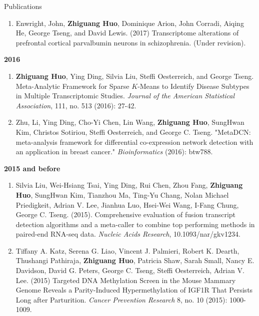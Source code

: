 \documentclass{resume} %
\begin{document}
\begin{rSection}{Publications}
\begin{enumerate}[noitemsep,topsep=0pt]
\item Enwright, John, {\bf Zhiguang Huo}, Dominique Arion, John Corradi, Aiqing He, George Tseng, and David Lewis. (2017) 
Transcriptome alterations of prefrontal cortical parvalbumin neurons in schizophrenia. (Under revision).


\end{enumerate}

\textbf{2016}
\begin{enumerate}[noitemsep,topsep=0pt,resume]

 \item  {\bf Zhiguang Huo}, Ying Ding, Silvia Liu, Steffi Oesterreich, and George Tseng. Meta-Analytic Framework for Sparse $K$-Means to Identify Disease Subtypes in Multiple Transcriptomic Studies. \emph{Journal of the American Statistical Association},  111, no. 513 (2016): 27-42.

\item Zhu, Li, Ying Ding, Cho-Yi Chen, Lin Wang, {\bf Zhiguang Huo}, SungHwan Kim, Christos Sotiriou, Steffi Oesterreich, and George C. Tseng. "MetaDCN: meta-analysis framework for differential co-expression network detection with an application in breast cancer." \emph{Bioinformatics} (2016): btw788.




\end{enumerate}


\textbf{2015 and before}
\begin{enumerate}[noitemsep,topsep=0pt,resume]
    \item Silvia Liu, Wei-Hsiang Tsai, Ying Ding, Rui Chen, Zhou Fang, {\bf Zhiguang Huo}, SungHwan Kim, Tianzhou Ma, Ting-Yu Chang, Nolan Michael Priedigkeit, Adrian V. Lee, Jianhua Luo, Hsei-Wei Wang, I-Fang Chung, George C. Tseng. (2015).
Comprehensive evaluation of fusion transcript detection algorithms and a meta-caller to combine top performing methods in paired-end RNA-seq data.
\emph{Nucleic Acids Research}, 10.1093/nar/gkv1234.

    \item Tiffany A. Katz, Serena G. Liao, Vincent J. Palmieri, Robert K. Dearth, Thushangi Pathiraja, {\bf Zhiguang Huo}, Patricia Shaw, Sarah Small, Nancy E. Davidson, David G. Peters, George C. Tseng, Steffi Oesterreich, Adrian V. Lee. (2015) Targeted DNA Methylation Screen in the Mouse Mammary Genome Reveals a Parity-Induced Hypermethylation of IGF1R That Persists Long after Parturition. \emph{Cancer Prevention Research} 8, no. 10 (2015): 1000-1009.


\end{enumerate}
\end{rSection}
\end{document}
